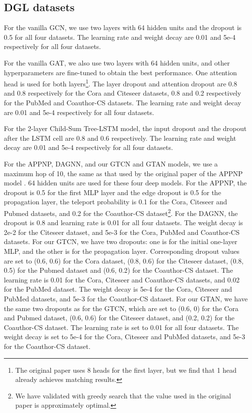 \documentclass[lettersize,journal]{IEEEtran}
\theoremstyle{plain}
\theoremstyle{definition}
\theoremstyle{remark}
\begin{document}
\subsection{DGL datasets}
For the vanilla GCN, we use two layers with 64 hidden units and the dropout is 0.5 for all four datasets. The learning rate and weight decay are 0.01 and 5e-4 respectively for all four datasets. 

For the vanilla GAT, we also use two layers with 64 hidden units, and other hyperparameters are fine-tuned to obtain the best performance. One attention head is used for both layers\footnote{The original paper \citep{DBLP:conf/iclr/VelickovicCCRLB18} uses 8 heads for the first layer, but we find that 1 head already achieves matching results.}. The layer dropout and attention dropout are 0.8 and 0.8 respectively for the Cora and Citeseer datasets, 0.8 and 0.2 respectively for the PubMed and Coauthor-CS datasets. The learning rate and weight decay are 0.01 and 5e-4 respectively for all four datasets. 

For the 2-layer Child-Sum Tree-LSTM model, the input dropout and the dropout after the LSTM cell are 0.8 and 0.6 respectively. The learning rate and weight decay are 0.01 and 5e-4 respectively for all four datasets. 

For the APPNP, DAGNN, and our GTCN and GTAN models, we use a maximum hop of 10, the same as that used by the original paper of the APPNP model \citep{klicpera2018predict}. 64 hidden units are used for these four deep models. For the APPNP, the dropout is 0.5 for the first MLP layer and the edge dropout is 0.5 for the propagation layer, the teleport probability  is 0.1 for the Cora, Citeseer and Pubmed datasets, and 0.2 for the Coauthor-CS dataset\footnote{We have validated with greedy search that the  value used in the original paper is approximately optimal.}. For the DAGNN, the dropout is 0.8 and learning rate is 0.01 for all four datasets. The weight decay is 2e-2 for the Citeseer dataset, and 5e-3 for the Cora, PubMed and Coauthor-CS datasets. For our GTCN, we have two dropouts: one is for the initial one-layer MLP, and the other is for the propagation layer. Corresponding dropout values are set to (0.6, 0.6) for the Cora dataset, (0.8, 0.6) for the Citeseer dataset, (0.8, 0.5) for the Pubmed dataset and (0.6, 0.2) for the Coauthor-CS dataset. The learning rate is 0.01 for the Cora, Citeseer and Coauthor-CS datasets, and 0.02 for the PubMed dataset. The weight decay is 5e-4 for the Cora, Citeseer and PubMed datasets, and 5e-3 for the Coauthor-CS dataset. For our GTAN, we have the same two dropouts as for the GTCN, which are set to (0.6, 0) for the Cora and Pubmed dataset, (0.6, 0.6) for the Citeseer dataset, and (0.2, 0.2) for the Coauthor-CS dataset. The learning rate is set to 0.01 for all four datasets. The weight decay is set to 5e-4 for the Cora, Citeseer and PubMed datasets, and 5e-3 for the Coauthor-CS dataset. 
\end{document}
